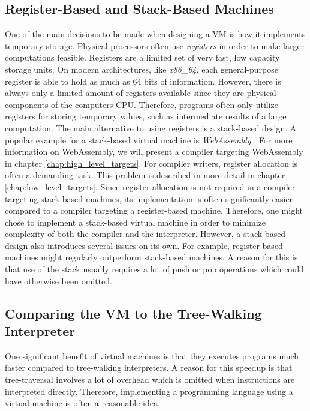 \subsection{Register-Based and Stack-Based Machines}

One of the main decisions to be made when designing a VM is how it implements temporary storage.
Physical processors often use \emph{registers} in order to make larger computations feasible.
Registers are a limited set of very fast, low capacity storage units.
On modern architectures, like \emph{x86\_64}, each general-purpose register is able to hold as much as 64 bits of information.
However, there is always only a limited amount of registers available since they are physical components of the computers CPU.
Therefore, programs often only utilize registers for storing temporary values, such as intermediate results of a large computation.
The main alternative to using registers is a stack-based design.
A popular example for a stack-based virtual machine is \emph{WebAssembly} \cite[p.~44]{Sendil2022-fy}.
For more information on WebAssembly, we will present a compiler targeting WebAssembly in chapter \ref{chap:high_level_targets}.
For compiler writers, register allocation is often a demanding task.
This problem is described in more detail in chapter \ref{chap:low_level_targets}.
Since register allocation is not required in a compiler targeting stack-based machines, its implementation is often significantly easier compared to a compiler targeting a register-based machine.
Therefore, one might chose to implement a stack-based virtual machine in order to minimize complexity of both the compiler and the interpreter.
However, a stack-based design also introduces several issues on its own.
For example, register-based machines might regularly outperform stack-based machines.
A reason for this is that use of the stack usually requires a lot of push or pop operations which could have otherwise been omitted.

\subsection{Comparing the VM to the Tree-Walking Interpreter}
One significant benefit of virtual machines is that they executes programs much faster compared to tree-walking interpreters.
A reason for this speedup is that tree-traversal involves a lot of overhead which is omitted when instructions are interpreted directly.
Therefore, implementing a programming language using a virtual machine is often a reasonable idea.

